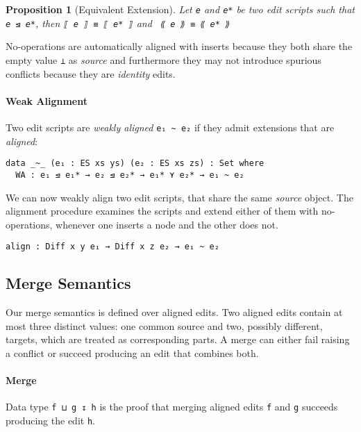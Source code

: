 \documentclass{sigplanconf}
\theoremstyle{plain}
\newtheorem{prop}{Proposition}
\begin{document}
\begin{prop}[Equivalent Extension]
Let \texttt{e} and \texttt{e*} be two edit scripts such that \texttt{e ⊴ e*}, then
\texttt{⟦ e ⟧ ≡ ⟦ e* ⟧} and \texttt{ ⟪ e ⟫ ≡ ⟪ e* ⟫}
\end{prop}

No-operations are automatically aligned with inserts because they both
share the empty value \texttt{⊥} as \emph{source} and furthermore they
may not introduce spurious conflicts because they are \emph{identity}
edits.
         
        \paragraph{Weak Alignment}
        Two edit scripts are \emph{weakly aligned} \texttt{e₁ \textasciitilde\ e₂} 
        if they admit extensions that are \emph{aligned}:
\begin{verbatim}
data _~_ (e₁ : ES xs ys) (e₂ : ES xs zs) : Set where
  WA : e₁ ⊴ e₁* → e₂ ⊴ e₂* → e₁* ⋎ e₂* → e₁ ~ e₂
\end{verbatim}

        We can now weakly align two edit scripts, that share the
        same \emph{source} object. The alignment procedure examines the scripts
        and extend either of them with no-operations, whenever one inserts a 
        node and the other does not. 
\begin{verbatim}
align : Diff x y e₁ → Diff x z e₂ → e₁ ~ e₂
\end{verbatim}

	\subsection{Merge Semantics}
        \label{subsec:merge-semantics}
	Our merge semantics is defined over aligned edits.
	Two aligned edits contain at most three distinct values: 
	one common source and two, 	possibly different, targets, which 
	are treated as corresponding parts.
	A merge can either fail raising a conflict or succeed producing
	an edit that combines both.
	
	\paragraph{Merge}
	Data type \texttt{f ⊔ g ↧ h} is the proof that merging aligned
        edits \texttt{f} and \texttt{g} succeeds producing the edit
        \texttt{h}.
	
\end{document}
